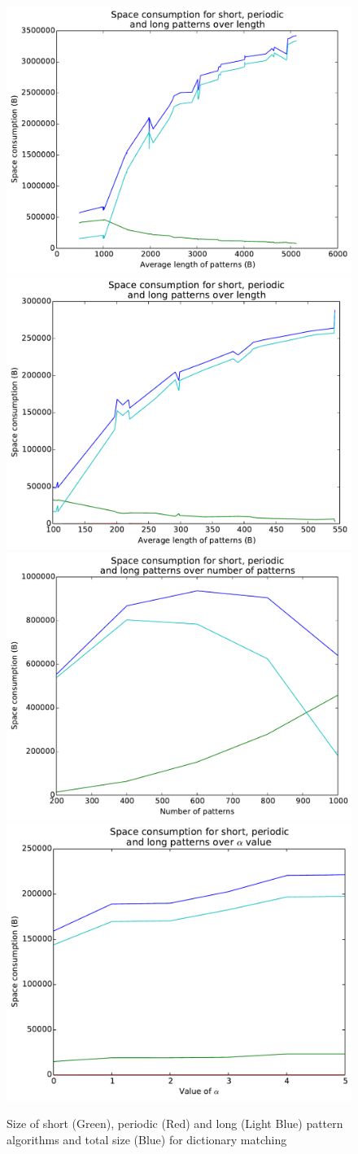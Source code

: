 \documentclass[ %
                    author={Dominic Joseph Moylett},
                    degree={MEng},
                     title={Dictionary Matching with Fingerprints},
                  subtitle={An Empirical Analysis},
                      type={research},
                      year={2015} ]{dissertation}
\begin{document}
\begin{figure}[t]
\begin{center}
  \includegraphics[width=0.5\linewidth]{part_size_length_1000_10000}\includegraphics[width=0.5\linewidth]{part_size_length_200_1000}
  \includegraphics[width=0.5\linewidth]{part_size_num_200_1000}\includegraphics[width=0.5\linewidth]{part_size_alpha}
\end{center}
\caption{Size of short (Green), periodic (Red) and long (Light Blue) pattern algorithms and total size (Blue) for dictionary matching}
\label{fig:case-results}
\end{figure}
\end{document}
